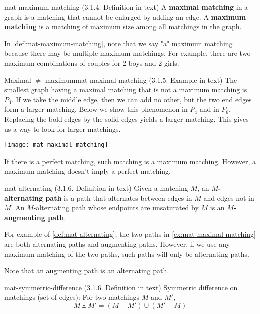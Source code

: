 \documentclass[../src/handouts/main.tex]{subfiles}
\begin{document}
\begin{definition}{}{mat-maximum-matching}
  (3.1.4. Definition in text)
  A \textbf{maximal matching} in a graph is a matching that cannot be enlarged by adding an edge. A \textbf{maximum matching} is a matching of maximum size among all matchings in the graph.
\end{definition}

In \cref{def:mat-maximum-matching}, note that we say "a" maximum matching because there may be multiple maximum matchings. For example, there are two maximum combinations of couples for 2 boys and 2 girls.

\begin{example}{Maximal $\neq$ maximum}{mat-maximal-matching}
  (3.1.5. Example in text)
  The smallest graph having a maximal matching that is not a maximum matching is $P_4$. If we take the middle edge, then we can add no other, but the two end edges form a larger matching. Below we show this phenomenon in $P_4$ and in $P_6$. Replacing the bold edges by the solid edges yields a larger matching. This gives us a way to look for larger matchings.

  \centering
  \texttt{[image: mat-maximal-matching]}
\end{example}

If there is a perfect matching, such matching is a maximum matching. However, a maximum matching doesn't imply a perfect matching.

\begin{definition}{}{mat-alternating}
  (3.1.6. Definition in text)
  Given a matching $M$, an $M$\textbf{-alternating path} is a path that alternates between edges in $M$ and edges not in $M$. An $M$-alternating path whose endpoints are unsaturated by $M$ is an $M$\textbf{-augmenting path}.
\end{definition}

For example of \cref{def:mat-alternating}, the two paths in \cref{ex:mat-maximal-matching} are both alternating paths and augmenting paths. However, if we use any maximum matching of the two paths, such paths will only be alternating paths.

Note that an augmenting path is an alternating path.

\begin{definition}{}{mat-symmetric-difference}
  (3.1.6. Definition in text)
  Symmetric difference on matchings (set of edges): For two matchings $M$ and $M'$,
  \[
    M \smalltriangleup M' = \left(M - M'\right) \cup \left(M' - M\right)
  \]
\end{definition}
\end{document}
